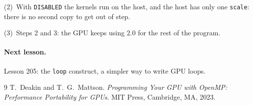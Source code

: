 \documentclass[11pt,a4paper]{article}
\let\origtexttt\texttt
\renewcommand{\texttt}[1]{\textcolor{black!60}{\origtexttt{#1}}}
\begin{document}
\noindent(2)~With \texttt{DISABLED} the kernels run on the host, and the host has only one
\texttt{scale}: there is no second copy to get out of step.

\noindent(3)~Steps 2 and 3: the GPU keeps using $2.0$ for the rest of the program.

\paragraph{Next lesson.} Lesson 205: the \texttt{loop} construct, a simpler way to write GPU
loops.

\begin{thebibliography}{9}
 T.~Deakin and T.~G.~Mattson. \emph{Programming Your GPU with OpenMP: Performance
  Portability for GPUs}. MIT Press, Cambridge, MA, 2023.
\end{thebibliography}
\end{document}
